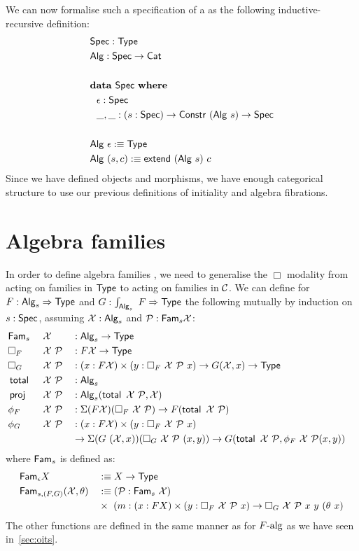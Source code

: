 \documentclass[a4paper,10pt]{report}
\begin{document}
We can now formalise such a specification of a \hit as the following
inductive-recursive definition:
%
\begin{align*}
  &\mathsf{Spec} : \mathsf{Type} \\
  &\mathsf{Alg} : \mathsf{Spec} \to \mathsf{Cat} \\
  \\
  &{\bf data}\ \mathsf{Spec}\ {\bf where} \\
  &\ \ \epsilon : \mathsf{Spec} \\
  &\ \ \_,\_ : (s : \mathsf{Spec}) \to \mathsf{Constr}\ (\mathsf{Alg}\ s) \to \mathsf{Spec} \\
  \\
  &\mathsf{Alg}\ \epsilon :\equiv \mathsf{Type}\\
  &\mathsf{Alg}\ (s , c) :\equiv \mathsf{extend}\ (\mathsf{Alg}\ s)\ c
\end{align*}
%
Since we have defined objects and morphisms, we have enough
categorical structure to use our previous definitions of initiality
and algebra fibrations. 

\section{Algebra families}
\label{sec:algfamhits}
In order to define algebra families , we need to generalise the $\Box$
modality from acting on families in $\mathsf{Type}$ to acting on families in
$\mathcal{C}$. We can define for $F : \mathsf{Alg}_s \Rightarrow \mathsf{Type}$ and
$G : \int_{\mathsf{Alg}_s}\ F \Rightarrow \mathsf{Type}$ the following mutually by induction
on $s : \mathsf{Spec}$, assuming $\mathcal{X} : \mathsf{Alg}_s$ and
$\mathcal{P} : \mathsf{Fam}_s \mathcal{X}$:
%
\begin{alignat*}{4}
  &\Fam_s\ &&\alg{X}             &&: \Alg_s \to \Type&\\
  &\Box_F\ &&\alg{X}\ \algfam{P} &&: F \alg{X} \to \Type&\\
  &\Box_G\ &&\alg{X}\ \algfam{P} &&: (x : F \alg{X}) \times (y : \Box_F\ \alg{X} \ \algfam{P}\ x) \to G (\alg{X} , x) \to \Type&\\
  &\total\ &&\alg{X}\ \algfam{P} &&: \Alg_s&\\
  &\proj\  &&\alg{X}\ \algfam{P} &&: \Alg_s(\total\ \alg{X}\ \algfam{P}, \alg{X})&\\
  &\phi_F\ &&\alg{X}\ \algfam{P} &&: \Sigma (F \alg{X}) (\Box_F\ \alg{X}\ \algfam{P}) \to F (\total\ \alg{X}\ \algfam{P})&\\
  &\phi_G\ &&\alg{X}\ \algfam{P} &&: (x : F \alg{X}) \times (y : \Box_F\ \alg{X} \ \algfam{P}\ x) &\\
  &&&&&\to \Sigma (G\ (\alg{X},x)) (\Box_G\ \alg{X}\ \algfam{P}\ (x, y)) 
            \to G (\total\ \alg{X}\ \algfam{P}, \phi_F\ \alg{X}\ \algfam{P} (x , y)) &
\end{alignat*}
%
where $\mathsf{Fam}_s$ is defined as:
\begin{align*}
  &\Fam_\epsilon X &&\ddefeq X \to \Type \\
  &\Fam_{s,(F,G)} (\alg{X},\theta) &&\ddefeq (\algfam{P} : \Fam_s\ \alg{X}) \\ 
  &&&\times\ (m : (x : FX) \times (y : \Box_F\ \alg{X}\ \algfam{P}\ x) \to \Box_G\ \alg{X}\ \algfam{P}\ x\ y\ (\theta\ x)
\end{align*}
%
The other functions are defined in the same manner as for $F\mbox{-alg}$
as we have seen in~\cref{sec:oits}.
\end{document}
